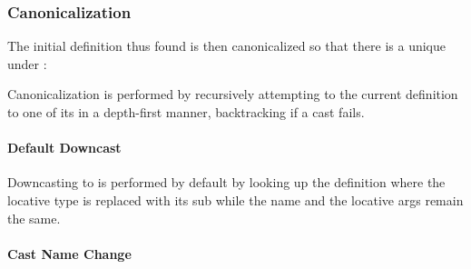 \subsubsection{Canonicalization}\label{canonicalization}

\label{x-28DREF-EXT-3A-40CANONICALIZATION-20MGL-PAX-3ASECTION-29}

The initial definition thus found is then canonicalized so that there is
a unique
under :

\begin{Shaded}
\begin{Highlighting}[]
\OperatorTok{\#\textquotesingle{}}
 \NormalTok{)}
 \NormalTok{)}
\end{Highlighting}
\end{Shaded}

Canonicalization is performed by recursively attempting to
the current definition to one of its
in a depth-first manner, backtracking if a cast fails.

\paragraph{Default Downcast}\label{default-downcast}

\label{x-28DREF-EXT-3A-40DEFAULT-DOWNCAST-20MGL-PAX-3ASECTION-29}

Downcasting to
 is performed by default by looking up the
definition where the locative type is replaced with its sub while the
name and the locative args remain the same.

\paragraph{Cast Name Change}\label{cast-name-change}

